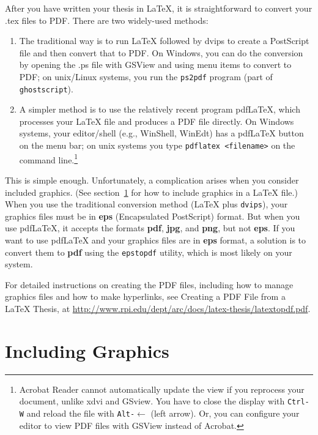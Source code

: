 \documentclass[letterpaper,11pt]{article}
\begin{document}
After you have written your thesis in {\LaTeX}, it is straightforward to convert your .tex files to
PDF. There are two widely-used methods:
\begin{enumerate}
\item The traditional way is to run {\LaTeX} followed by dvips to
  create a PostScript file and then convert that to PDF. On Windows,
  you can do the conversion by opening the .ps file with GSView and
  using menu items to convert to PDF; on unix/Linux systems, you run
  the \verb|ps2pdf| program (part of \verb|ghostscript|).

\item A simpler method is to use the relatively recent program
  pdf{\LaTeX}, which processes your {\LaTeX} file and produces a PDF
  file directly. On Windows systems, your editor/shell (e.g.,
  WinShell, WinEdt) has a pdf{\LaTeX} button on the menu bar; on unix
  systems you type \verb|pdflatex <filename>| on the command
  line.\footnote{Acrobat Reader cannot automatically update the view
    if you reprocess your document, unlike xdvi and GSview. You have
    to close the display with \texttt{Ctrl-W} and reload the file with \texttt{Alt-}{$\leftarrow$}
    (left arrow). Or, you can configure your editor to view PDF files
    with GSView instead of Acrobat.}
\end{enumerate}
This is simple enough. Unfortunately, a complication arises when you
consider included graphics.
(See section~\ref{sec:graphics}
for how to include graphics
in a {\LaTeX} file.) When you use the traditional conversion method
({\LaTeX} plus \verb|dvips|), your graphics files must be in \textbf{eps}
(Encapsulated PostScript) format. But when you use pdf{\LaTeX}, it
accepts the formats \textbf{pdf}, \textbf{jpg}, and \textbf{png}, but not \textbf{eps}. If you want to use
pdf{\LaTeX} and your graphics files are in \textbf{eps} format, a solution is
to convert them to \textbf{pdf} using the \verb|epstopdf| utility, which is most
likely on your system.

For detailed instructions on creating the PDF files, including how to manage graphics files and
how to make hyperlinks, see Creating a PDF File from a {\LaTeX} Thesis, at
\url{http://www.rpi.edu/dept/arc/docs/latex-thesis/latextopdf.pdf}.


\section{Including Graphics}
\label{sec:graphics}
\end{document}
